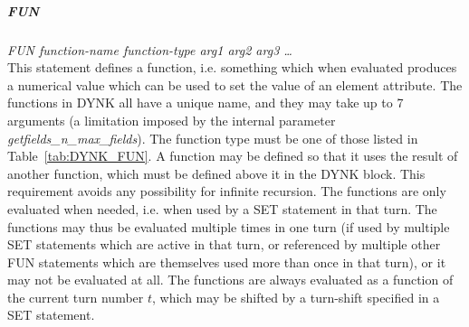 \documentclass[a4paper,11pt]{report}
\begin{document}
\subparagraph{FUN} \emph{FUN function-name function-type arg1 arg2 arg3 \ldots}\\
This statement defines a function, i.e. something which when evaluated produces a numerical value which can be used to set the value of an element attribute.
The functions in DYNK all have a unique name, and they may take up to 7 arguments (a limitation imposed by the internal parameter \emph{getfields\_n\_max\_fields}).
The function type must be one of those listed in Table~\ref{tab:DYNK_FUN}.
A function may be defined so that it uses the result of another function, which must be defined above it in the DYNK block.
This requirement avoids any possibility for infinite recursion.
The functions are only evaluated when needed, i.e. when used by a SET statement in that turn.
The functions may thus be evaluated multiple times in one turn (if used by multiple SET statements which are active in that turn, or referenced by multiple other FUN statements which are themselves used more than once in that turn), or it may not be evaluated at all.
The functions are always evaluated as a function of the current turn number $t$, which may be shifted by a turn-shift specified in a SET statement.
\end{document}

